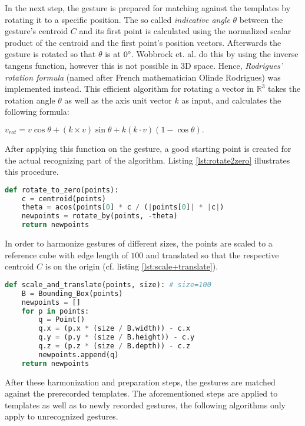 In the next step, the gesture is prepared for matching against the templates by rotating it to a specific position. The so called \textit{indicative angle} $\theta$ between the gesture's centroid $C$ and its first point is calculated using the normalized scalar product of the centroid and the first point's position vectors. Afterwards the gesture is rotated so that $\theta$ is at $0\degree$. Wobbrock et. al. do this by using the inverse tangens function, however this is not possible in 3D space. Hence, \textit{Rodrigues' rotation formula} (named after French mathematician Olinde Rodrigues) was implemented instead. This efficient algorithm for rotating a vector in $\mathbb{R}^3$ takes the rotation angle $\theta$ as well as the axis unit vector $k$ as input, and calculates the following formula:

\begin{center}
\(
v_{rot} = v \cos\theta + (k \times v)\sin\theta + k (k \cdot v) (1 - \cos\theta).
\) \cite{koks2006}
\end{center}

After applying this function on the gesture, a good starting point is created for the actual recognizing part of the algorithm. Listing \ref{lst:rotate2zero} illustrates this procedure.

\begin{lstlisting}[label=lst:rotate2zero,language=python,frame=lt,caption=Rotation of points so that their indicative angle is at $0 \degree$]
def rotate_to_zero(points):
	c = centroid(points)
	theta = acos(points[0] * c / (|points[0]| * |c|)
	newpoints = rotate_by(points, -theta)
	return newpoints
\end{lstlisting}

In order to harmonize gestures of different sizes, the points are scaled to a reference cube with edge length of $100$ and translated so that the respective centroid $C$ is on the origin (cf. listing \ref{lst:scale+translate}).

\begin{lstlisting}[label=lst:scale+translate,language=python,frame=lt,caption=Scaling to reference cube and translation to origin]
def scale_and_translate(points, size): # size=100
	B = Bounding_Box(points)
	newpoints = []
	for p in points:
		q = Point()
		q.x = (p.x * (size / B.width)) - c.x
		q.y = (p.y * (size / B.height)) - c.y
		q.z = (p.z * (size / B.depth)) - c.z
		newpoints.append(q)
	return newpoints
\end{lstlisting}

After these harmonization and preparation steps, the gestures are matched against the prerecorded templates. The aforementioned steps are applied to templates as well as to newly recorded gestures, the following algorithms only apply to unrecognized gestures.

